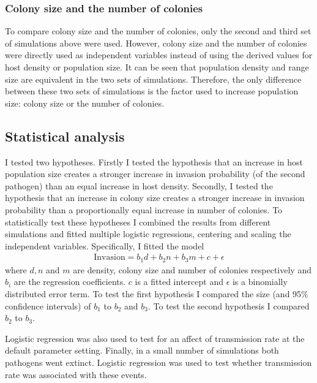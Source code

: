 \subsubsection{Colony size and the number of colonies}

To compare colony size and the number of colonies, only the second and third set of simulations above were used.
However, colony size and the number of colonies were directly used as independent variables instead of using the derived values for host density or population size.
It can be seen that population density and range size are equivalent in the two sets of simulations.
Therefore, the only difference between these two sets of simulations is the factor used to increase population size: colony size or the number of colonies.




\subsection{Statistical analysis}

I tested two hypotheses.
Firstly I tested the hypothesis that an increase in host population size creates a stronger increase in invasion probability (of the second pathogen) than an equal increase in host density.
Secondly, I tested the hypothesis that an increase in colony size creates a stronger increase in invasion probability than a proportionally equal increase in number of colonies.
To statistically test these hypotheses I combined the results from different simulations and fitted multiple logistic regressions, centering and scaling the independent variables.
Specifically, I fitted the model 
\begin{align}
  \text{Invasion} = b_1 d + b_2 n + b_3 m + c + \epsilon
\end{align}
where $d, n$ and $m$ are density, colony size and number of colonies respectively and $b_i$ are the regression coefficients. 
$c$ is a fitted intercept and $\epsilon$ is a binomially distributed error term.
To test the first hypothesis I compared the size (and 95\% confidence intervals) of $b_1$ to $b_2$ and $b_3$.
To test the second hypothesis I compared $b_2$ to $b_3$.

Logistic regression was also used to test for an affect of transmission rate at the default parameter setting.
Finally, in a small number of simulations both pathogens went extinct.
Logistic regression was used to test whether transmission rate was associated with these events.




